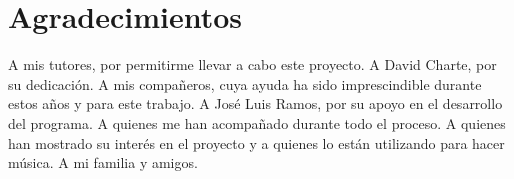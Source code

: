 

\chapter{Agradecimientos}

A mis tutores, por permitirme llevar a cabo este proyecto. A David Charte, por su dedicación. A mis compañeros, cuya ayuda ha sido imprescindible durante estos años y para este trabajo. A José Luis Ramos, por su apoyo en el desarrollo del programa. A quienes me han acompañado durante todo el proceso. A quienes han mostrado su interés en el proyecto y a quienes lo están utilizando para hacer música. A mi familia y amigos.

\cleardoublepage
\endinput
